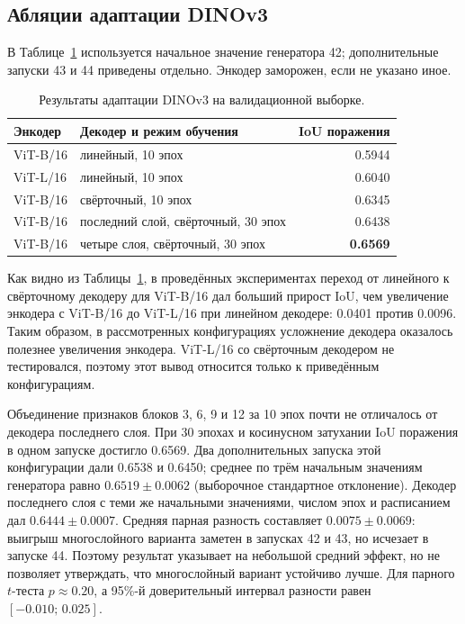 \documentclass[a4paper,12pt]{extarticle}
\begin{document}
\subsection{Абляции адаптации DINOv3}

В Таблице~\ref{tab:preliminary} используется начальное значение генератора 42;
дополнительные запуски 43 и 44 приведены отдельно. Энкодер заморожен, если не
указано иное.

\begin{table}[ht]
  \caption{Результаты адаптации DINOv3 на валидационной выборке.}
  \label{tab:preliminary}
  \centering
  \small
  \begin{tabular}{llr}
    \toprule
    Энкодер & Декодер и режим обучения & IoU поражения \\
    \midrule
    ViT-B/16 & линейный, 10 эпох & 0.5944 \\
    ViT-L/16 & линейный, 10 эпох & 0.6040 \\
    ViT-B/16 & свёрточный, 10 эпох & 0.6345 \\
    ViT-B/16 & последний слой, свёрточный, 30 эпох & 0.6438 \\
    ViT-B/16 & четыре слоя, свёрточный, 30 эпох & \textbf{0.6569} \\
    \bottomrule
  \end{tabular}
\end{table}

Как видно из Таблицы~\ref{tab:preliminary}, в проведённых экспериментах переход
от линейного к свёрточному декодеру для ViT-B/16 дал больший прирост IoU, чем
увеличение энкодера с ViT-B/16 до ViT-L/16 при линейном декодере: 0.0401 против
0.0096. Таким образом, в рассмотренных конфигурациях усложнение декодера оказалось
полезнее увеличения энкодера. ViT-L/16 со свёрточным декодером не тестировался,
поэтому этот вывод относится только к приведённым конфигурациям.

Объединение признаков блоков 3, 6, 9 и 12 за 10 эпох почти не отличалось от
декодера последнего слоя. При 30 эпохах и косинусном затухании IoU поражения в
одном запуске достигло 0.6569. Два дополнительных запуска этой конфигурации дали 0.6538 и
0.6450; среднее по трём начальным значениям генератора равно
$0.6519\pm0.0062$ (выборочное стандартное
отклонение). Декодер последнего слоя с теми же начальными значениями, числом эпох и
расписанием дал $0.6444\pm0.0007$. Средняя парная разность составляет
$0.0075\pm0.0069$: выигрыш многослойного варианта заметен в запусках 42 и 43,
но исчезает в запуске 44. Поэтому результат указывает на небольшой средний эффект,
но не позволяет утверждать, что многослойный вариант устойчиво лучше. Для
парного $t$-теста $p\approx0.20$, а 95\%-й доверительный интервал разности равен
$[-0.010;\,0.025]$.
\end{document}

